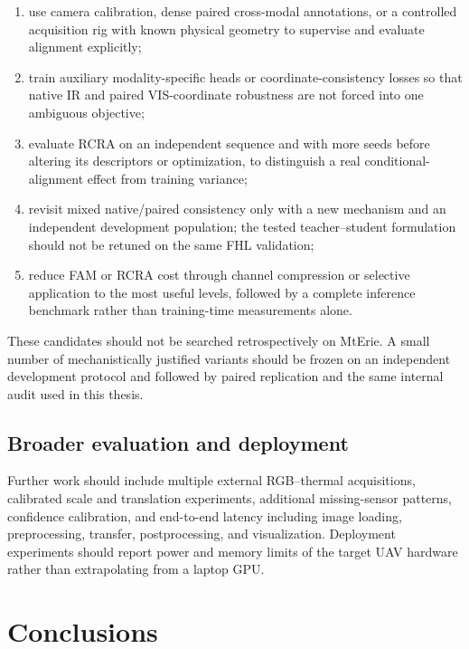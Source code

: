 \begin{enumerate}[label=\arabic*.]
  \item use camera calibration, dense paired cross-modal annotations, or a
        controlled acquisition rig with known physical geometry to supervise
        and evaluate alignment explicitly;
  \item train auxiliary modality-specific heads or coordinate-consistency
        losses so that native IR and paired VIS-coordinate robustness are not
        forced into one ambiguous objective;
  \item evaluate RCRA on an independent sequence and with more seeds before
        altering its descriptors or optimization, to distinguish a real
        conditional-alignment effect from training variance;
  \item revisit mixed native/paired consistency only with a new mechanism and
        an independent development population; the tested teacher--student
        formulation should not be retuned on the same FHL validation;
  \item reduce FAM or RCRA cost through channel compression or selective
        application to the most useful levels, followed by a complete inference
        benchmark rather than training-time measurements alone.
\end{enumerate}

These candidates should not be searched retrospectively on MtErie. A small
number of mechanistically justified variants should be frozen on an independent
development protocol and followed by paired replication and the same internal
audit used in this thesis.

\subsection{Broader evaluation and deployment}

Further work should include multiple external RGB--thermal acquisitions,
calibrated scale and translation experiments, additional missing-sensor
patterns, confidence calibration, and end-to-end latency including image
loading, preprocessing, transfer, postprocessing, and visualization. Deployment
experiments should report power and memory limits of the target UAV hardware
rather than extrapolating from a laptop GPU.

\section{Conclusions}

